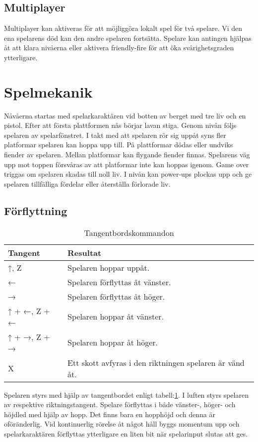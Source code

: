 \documentclass{TDP005mall}
\begin{document}
\subsection*{Multiplayer}
Multiplayer kan aktiveras för att möjliggöra lokalt spel för två spelare. Vi den ena spelarens död kan den andre spelaren fortsätta. Spelare kan antingen hjälpas åt att klara nivåerna eller aktivera friendly-fire för att öka svårighetsgraden ytterligare.

\section{Spelmekanik}%
Nåvåerna startas med spelarkaraktären vid botten av berget med tre liv och en pistol. Efter att första plattformen nås börjar lavan stiga. Genom nivån följs spelaren av spelarfönstret. I takt med att spelaren rör sig uppåt syns fler platformar spelaren kan hoppa upp till. På plattformar dödas eller undviks fiender av spelaren. Mellan platformar kan flygande fiender finnas. Spelarens väg upp mot toppen försvåras av att platformar inte kan hoppas igenom. Game over triggas om spelaren skadas till noll liv. I nivån kan power-ups plockas upp och ge spelaren tillfälliga fördelar eller återställa förlorade liv. 

\subsection{Förflyttning}

\begin{table}[h!]
  \centering
  \caption{Tangentbordskommandon\label{tab:1}}
\begin{tabular}{|l|l|}
\hline
Tangent & Resultat \\\hline
↑, Z & Spelaren hoppar uppåt. \\\hline
← & Spelaren förflyttas åt vänster. \\\hline
→ & Spelaren förflyttas åt höger. \\\hline
↑ + ←, Z + ← & Spelaren hoppar åt vänster. \\\hline
↑ + →, Z + → & Spelaren hoppar åt höger. \\\hline
X & Ett skott avfyras i den riktningen spelaren är vänd åt. \\\hline
\end{tabular}
\end{table}


Spelaren styrs med hjälp av tangentbordet enligt tabell:\ref{tab:1}. I luften styrs spelaren av respektive riktningstangent. Spelare förflyttas i både vänster-, höger- och höjdled med hjälp av hopp. Det finns bara en hopphöjd och denna är oföränderlig. Vid kontinuerlig rörelse åt något håll byggs momentum upp och spelarkaraktären förflyttas ytterligare en liten bit när spelarinput slutas att ges.
\end{document}
